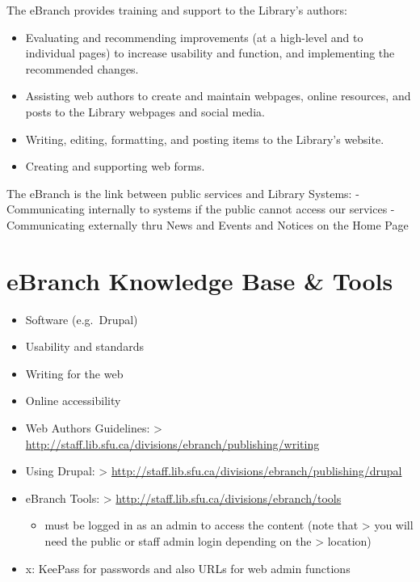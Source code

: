 \documentclass[
  openany]{book}
\providecommand{\tightlist}{%
  \setlength{\itemsep}{0pt}\setlength{\parskip}{0pt}}
\begin{document}
The eBranch provides training and support to the Library's authors:

\begin{itemize}
\tightlist
\item
  Evaluating and recommending improvements (at a high-level and to individual pages) to increase usability and function, and implementing the recommended changes.
\item
  Assisting web authors to create and maintain webpages, online resources, and posts to the Library webpages and social media.
\item
  Writing, editing, formatting, and posting items to the Library's website.
\item
  Creating and supporting web forms.
\end{itemize}

The eBranch is the link between public services and Library Systems:
- Communicating internally to systems if the public cannot access our services
- Communicating externally thru News and Events and Notices on the Home Page

\hypertarget{ebranch-knowledge-base-tools}{%
\section{eBranch Knowledge Base \& Tools}\label{ebranch-knowledge-base-tools}}

\begin{itemize}
\item
  Software (e.g.~Drupal)
\item
  Usability and standards
\item
  Writing for the web
\item
  Online accessibility
\item
  Web Authors Guidelines:
  \textgreater{} \href{http://staff.lib.sfu.ca/divisions/ebranch/publishing/writing}{{http://staff.lib.sfu.ca/divisions/ebranch/publishing/writing}}
\item
  Using Drupal:
  \textgreater{} \href{http://staff.lib.sfu.ca/divisions/ebranch/publishing/drupal}{{http://staff.lib.sfu.ca/divisions/ebranch/publishing/drupal}}
\item
  eBranch Tools:
  \textgreater{} \href{http://staff.lib.sfu.ca/divisions/ebranch/tools}{{http://staff.lib.sfu.ca/divisions/ebranch/tools}}

  \begin{itemize}
  \tightlist
  \item
    must be logged in as an admin to access the content (note that
    \textgreater{} you will need the public or staff admin login depending on the
    \textgreater{} location)
  \end{itemize}
\item
  x: KeePass for passwords and also URLs for web admin functions
\end{itemize}
\end{document}
